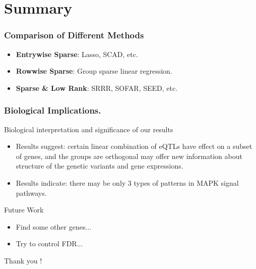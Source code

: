 \section{Summary}
\begin{frame}
\sectionpage
\end{frame}

\begin{frame}
    \frametitle{Comparison of Different Methods}
    \begin{itemize}
        \item \textbf{Entrywise Sparse}: Lasso, SCAD, etc.
        \item \textbf{Rowwise Sparse}: Group sparse linear regression.  
        \item \textbf{Sparse \& Low Rank}: SRRR, SOFAR, SEED, etc.
    \end{itemize}
\end{frame}


\begin{frame}
    \frametitle{Biological Implications.}
    \begin{block}{Biological interpretation and significance of our results}
        \begin{itemize}
            \item Results suggest: 
            certain linear combination of eQTLs have effect on a subset of genes, and the groups are orthogonal may offer new information about structure of the genetic variants and gene expressions. 
            \item Results indicate: 
            there may be only $3$ types of patterns in MAPK signal pathways. 
        \end{itemize}
    \end{block}
\end{frame}

\begin{frame}
    \begin{block}{Future Work}
        \begin{itemize}
            \item Find some other genes...
            \item Try to control FDR...
            
        \end{itemize}
    \end{block}

    \vspace{24pt}
    \begin{flushright}
        Thank you !
    \end{flushright}
\end{frame}


